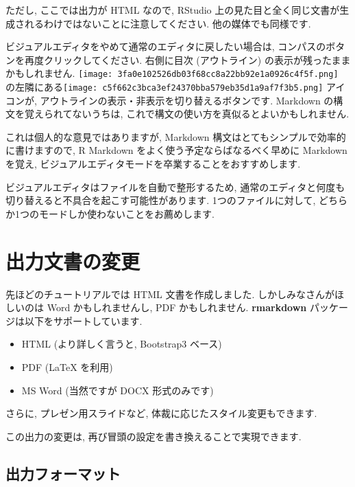 \documentclass[
]{ltjsarticle}
\providecommand{\tightlist}{%
  \setlength{\itemsep}{0pt}\setlength{\parskip}{0pt}}
\newenvironment{infobox}[1]{\begin{itemize}\renewcommand{\labelitemi}{\raisebox{-.7\height}[0pt][0pt]{%
  {\setkeys{Gin}{width=3em,keepaspectratio}\texttt{[image: \_latex/\_img/\#1]}}}}
  \setlength{\fboxsep}{1em}
  \begin{greyblock}
  \item
  }{\end{greyblock}\end{itemize}
}
\begin{document}
ただし, ここでは出力が HTML なので, RStudio 上の見た目と全く同じ文書が生成されるわけではないことに注意してください. 他の媒体でも同様です.

ビジュアルエディタをやめて通常のエディタに戻したい場合は, コンパスのボタンを再度クリックしてください. 右側に目次 (アウトライン) の表示が残ったままかもしれません. \texttt{[image: 3fa0e102526db03f68cc8a22bb92e1a0926c4f5f.png]} の左隣にある\texttt{[image: c5f662c3bca3ef24370bba579eb35d1a9af7f3b5.png]} アイコンが, アウトラインの表示・非表示を切り替えるボタンです. Markdown の構文を覚えられてないうちは, これで構文の使い方を真似るとよいかもしれません.

これは個人的な意見ではありますが, Markdown 構文はとてもシンプルで効率的に書けますので, R Markdown をよく使う予定ならばなるべく早めに Markdown を覚え, ビジュアルエディタモードを卒業することをおすすめします.

\begin{infobox}{important}
ビジュアルエディタはファイルを自動で整形するため, 通常のエディタと何度も切り替えると不具合を起こす可能性があります. 1つのファイルに対して, どちらか1つのモードしか使わないことをお薦めします.

\end{infobox}

\hypertarget{outputs}{%
\section{出力文書の変更}\label{outputs}}

先ほどのチュートリアルでは HTML 文書を作成しました. しかしみなさんがほしいのは Word かもしれませんし, PDF かもしれません. \textbf{rmarkdown} パッケージは以下をサポートしています.

\begin{itemize}
\tightlist
\item
  HTML (より詳しく言うと, Bootstrap3 ベース)
\item
  PDF (LaTeX を利用)
\item
  MS Word (当然ですが DOCX 形式のみです)
\end{itemize}

さらに, プレゼン用スライドなど, 体裁に応じたスタイル変更もできます.

この出力の変更は, 再び冒頭の設定を書き換えることで実現できます.

\hypertarget{ux51faux529bux30d5ux30a9ux30fcux30deux30c3ux30c8}{%
\subsection{出力フォーマット}\label{ux51faux529bux30d5ux30a9ux30fcux30deux30c3ux30c8}}
\end{document}
